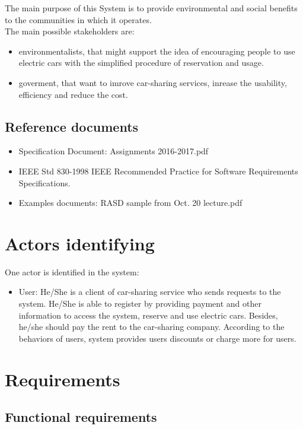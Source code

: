 \documentclass[12pt, letterpaper]{article}
\begin{document}
The main purpose of this System is to provide environmental and social benefits to the communities in which it operates. \\
The main possible stakeholders are:
\begin{itemize}
\item environmentalists, that might support the idea of encouraging people to use electric cars with the simplified procedure of reservation and usage. 
\item goverment, that want to imrove car-sharing services, inrease the usability, efficiency and reduce the cost.
\end{itemize}


\subsection{Reference documents}
\begin{itemize}
	\item Specification Document: Assignments 2016-2017.pdf
	\item IEEE Std 830-1998 IEEE Recommended Practice for Software Requirements Specifications.
	\item Examples documents: RASD sample from Oct. 20 lecture.pdf
\end{itemize}

\newpage

\section{Actors identifying}


One actor is identified in the system:
\begin{itemize}
\item User: He/She is a client of car-sharing service who sends requests to the system. He/She is able to register by providing payment and other information to access the system, reserve and use electric cars. Besides, he/she should pay the rent to the car-sharing company. According to the behaviors of
users, system provides users discounts or charge more for users.
\end{itemize}

\newpage

\section{Requirements}
\subsection{Functional requirements}
\end{document}
